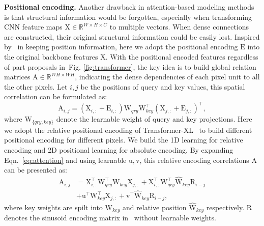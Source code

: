 \documentclass[journal]{IEEEtran}
\newcommand{\figref}[1]{Fig. \ref{#1}}
\newcommand{\br}[1]{\bm{\mathrm{#1}}}
\begin{document}
\textbf{Positional encoding.}
Another drawback in attention-based modeling methods is that structural information would be forgotten, especially when transforming CNN feature maps $\br{X}\in \mathbb{R}^{W \times H \times C}$ to multiple vectors. When dense connections are constructed, their original structural information could be easily lost.
Inspired by~\cite{vaswani2017attention,carion2020end} in keeping position information, here we adopt the positional encoding $\br{E}$ into the original backbone features $\br{X}$. With the positional encoded features regardless of part proposals in~\figref{fig:transformer}, the key idea is to build global relation matrices $\br{A} \in \mathbb{R}^{WH \times WH}$, indicating the dense dependencies of each pixel unit to all the other pixels. Let $i, j$ be the positions of query and key values, this spatial correlation can be formulated as:
\begin{equation}\label{eq:attention}
\br{A}_{i,j} = (\br{X}_{i,:} +  \br{E}_{i,:}) \br{W}_{qry} \br{W}_{key}^{\top} (\br{X}_{j,:}+\br{E}_{j,:})^{\top},
\end{equation}
where $\br{W}_{\{qry,key\}}$ denote the learnable weight of query and key projections. Here we adopt the relative positional encoding of Transformer-XL~\cite{dai2019transformer} to build different positional encoding for different pixels. We build the 1D learning for relative encoding and 2D positional learning for absolute encoding.  By expanding Eqn.~\eqref{eq:attention} and using learnable $\br{u},\br{v}$, this relative encoding correlations $\br{A}$ can be presented as:
\begin{equation}\label{eq:relative}
\begin{split}
\br{A}_{i,j}&= \br{X}_{i,:}^{\top} \br{W}_{qry}^{\top} \br{W}_{key}\br{X}_{j,:}+ \br{X}_{i,:}^{\top}\br{W}_{qry}^{\top} \widehat{\br{W}}_{key}\br{R}_{i-j}\\
& + \br{u}^{\top}\br{W}_{key}^{\top}\br{X}_{j,:}+ \br{v}^{\top}\widehat{\br{W}}_{key}\br{R}_{i-j},
\end{split}
\end{equation}
where key weights are spilt into $\br{W}_{key}$ and relative position $\widehat{\br{W}}_{key}$ respectively. $\br{R}$ denotes the sinusoid encoding matrix in~\cite{vaswani2017attention} without learnable weights.
\end{document}
